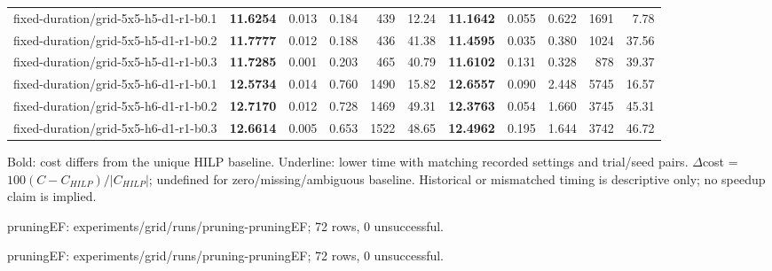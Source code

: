 \documentclass[10pt]{article}
\begin{document}
\begin{tabular}{p{65mm}rrrrrrrrrr}
fixed-\allowbreak duration/\allowbreak grid-\allowbreak 5x5-\allowbreak h5-\allowbreak d1-\allowbreak r1-\allowbreak b0.1 & \textbf{11.6254} & 0.013 & 0.184 & 439 & 12.24 & \textbf{11.1642} & 0.055 & 0.622 & 1691 & 7.78 \\
fixed-\allowbreak duration/\allowbreak grid-\allowbreak 5x5-\allowbreak h5-\allowbreak d1-\allowbreak r1-\allowbreak b0.2 & \textbf{11.7777} & 0.012 & 0.188 & 436 & 41.38 & \textbf{11.4595} & 0.035 & 0.380 & 1024 & 37.56 \\
fixed-\allowbreak duration/\allowbreak grid-\allowbreak 5x5-\allowbreak h5-\allowbreak d1-\allowbreak r1-\allowbreak b0.3 & \textbf{11.7285} & 0.001 & 0.203 & 465 & 40.79 & \textbf{11.6102} & 0.131 & 0.328 & 878 & 39.37 \\
fixed-\allowbreak duration/\allowbreak grid-\allowbreak 5x5-\allowbreak h6-\allowbreak d1-\allowbreak r1-\allowbreak b0.1 & \textbf{12.5734} & 0.014 & 0.760 & 1490 & 15.82 & \textbf{12.6557} & 0.090 & 2.448 & 5745 & 16.57 \\
fixed-\allowbreak duration/\allowbreak grid-\allowbreak 5x5-\allowbreak h6-\allowbreak d1-\allowbreak r1-\allowbreak b0.2 & \textbf{12.7170} & 0.012 & 0.728 & 1469 & 49.31 & \textbf{12.3763} & 0.054 & 1.660 & 3745 & 45.31 \\
fixed-\allowbreak duration/\allowbreak grid-\allowbreak 5x5-\allowbreak h6-\allowbreak d1-\allowbreak r1-\allowbreak b0.3 & \textbf{12.6614} & 0.005 & 0.653 & 1522 & 48.65 & \textbf{12.4962} & 0.195 & 1.644 & 3742 & 46.72 \\
\bottomrule\end{tabular}\par
\medskip\footnotesize
Bold: cost differs from the unique HILP baseline. Underline: lower time with matching recorded settings and trial/seed pairs. $\Delta$cost = $100(C-C_{HILP})/|C_{HILP}|$; undefined for zero/missing/ambiguous baseline. Historical or mismatched timing is descriptive only; no speedup claim is implied.\par
pruningEF: experiments/grid/runs/pruning-pruningEF; 72 rows, 0 unsuccessful.\par
pruningEF: experiments/grid/runs/pruning-pruningEF; 72 rows, 0 unsuccessful.\par
\clearpage
\end{document}
